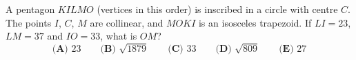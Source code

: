A pentagon $KILMO$ (vertices in this order) is inscribed in a circle with centre $C$. The points $I$, $C$, $M$ are collinear, and $MOKI$ is an isosceles trapezoid. If $LI=23$, $LM=37$ and $IO=33$, what is $OM$?
\[\textbf{(A) }23\qquad\textbf{(B) }\sqrt{1879}\qquad\textbf{(C) }33\qquad\textbf{(D) }\sqrt{809}\qquad\textbf{(E) }27\]
